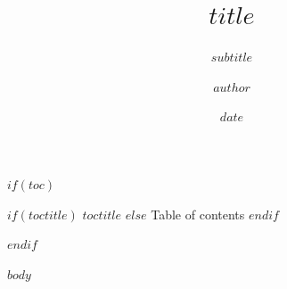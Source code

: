 \documentclass[aspectratio=169, compress,10pt]{beamer}
\title{$title$}
\subtitle{$subtitle$}
\author{$author$}
\institute{$institute$}
\date{$date$}
\begin{document}


$if(toc)$
\begin{frame}{
	$if(toctitle)$%
	$toctitle$%
	$else$%
	Table of contents%
	$endif$%
	}
	\tableofcontents
\end{frame}
$endif$

$body$
\end{document}
